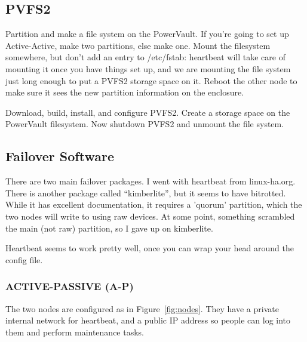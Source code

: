 \documentclass[11pt]{article}
\begin{document}
\subsection{PVFS2}

Partition and make a file system on the PowerVault.  If you're going to
set up Active-Active, make two partitions, else make one.  Mount the
filesystem somewhere, but don't add an entry to /etc/fstab: heartbeat
will take care of mounting it once you have things set up, and we are
mounting the file system just long enough to put a PVFS2 storage space
on it.  Reboot the other node to make sure it sees the new partition
information on the enclosure.

Download, build, install, and configure PVFS2.  Create a storage space
on the PowerVault filesystem.  Now shutdown PVFS2 and unmount the file
system.  

\subsection{Failover Software}

There are two main failover packages.  I went with heartbeat from
linux-ha.org.  There is another package called ``kimberlite'', but it
seems to have bitrotted.  While it has excellent documentation, it
requires a 'quorum' partition, which the two nodes will write to using
raw devices.  At some point, something scrambled the main (not raw)
partition, so I gave up on kimberlite.  

Heartbeat seems to work pretty well, once you can wrap your head around
the config file.


\subsubsection{ACTIVE-PASSIVE (A-P)}

The two nodes are configured as in Figure~\ref{fig:nodes}.  They have a
private internal network for heartbeat, and a public IP address so
people can log into them and perform maintenance tasks.
\end{document}
